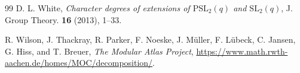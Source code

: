 \documentclass[11pt,a4paper]{article}
\numberwithin{equation}{section}
\theoremstyle{definition}
\theoremstyle{remark}
\begin{document}
\begin{thebibliography}{99}
D. L. White, \emph{Character degrees of extensions of
\(\mathrm{PSL}_2(q)\) and \(\mathrm{SL}_2(q)\)},
J. Group Theory. \textbf{16} (2013), 1--33.



R. Wilson, J. Thackray, R. Parker, F. Noeske, J. Müller, F. Lübeck, C. Jansen, G. Hiss, and T. Breuer, \emph{The Modular Atlas Project}, \url{https://www.math.rwth-aachen.de/homes/MOC/decomposition/}.





\end{thebibliography}
\end{document}
